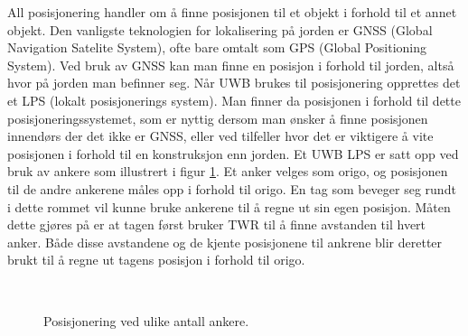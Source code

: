 All posisjonering handler om å finne posisjonen til et objekt i forhold til et annet objekt. 
Den vanligste teknologien for lokalisering på jorden er GNSS (Global Navigation Satelite System), 
ofte bare omtalt som GPS (Global Positioning System). Ved bruk av GNSS kan man finne en posisjon i forhold til jorden, 
altså hvor på jorden man befinner seg. Når UWB brukes til posisjonering opprettes det et LPS (lokalt posisjonerings system). 
Man finner da posisjonen i forhold til dette posisjoneringssystemet, som er nyttig dersom man ønsker å finne posisjonen innendørs der det ikke er GNSS, 
eller ved tilfeller hvor det er viktigere å vite posisjonen i forhold til en konstruksjon enn jorden. Et UWB LPS er satt opp ved bruk av ankere som 
illustrert i figur \ref{fig:ankere}. Et anker velges som origo, og posisjonen til de andre ankerene måles opp i forhold til origo. 
En tag som beveger seg rundt i dette rommet vil kunne bruke ankerene til å regne ut sin egen posisjon. 
Måten dette gjøres på er at tagen først bruker TWR til å finne avstanden til hvert anker. Både disse avstandene og de kjente posisjonene til 
ankrene blir deretter brukt til å regne ut tagens posisjon i forhold til origo.

\begin{figure}[h]
\centering
{} \quad
{} \\
 \quad
{}
\caption[Posisjonering ved ulike antall ankere.]{Posisjonering ved ulike antall ankere.} %
\label{fig:ankere}
\end{figure}